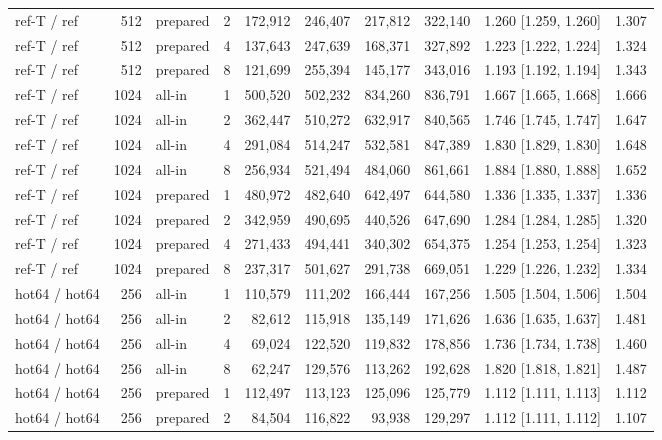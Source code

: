 \begin{table}[t]
{\begin{tabular}{lrlrrrrrlr}
ref-T / ref & 512 & prepared & 2 & 172{,}912 & 246{,}407 & 217{,}812 & 322{,}140 & 1.260 [1.259, 1.260] & 1.307 \\
ref-T / ref & 512 & prepared & 4 & 137{,}643 & 247{,}639 & 168{,}371 & 327{,}892 & 1.223 [1.222, 1.224] & 1.324 \\
ref-T / ref & 512 & prepared & 8 & 121{,}699 & 255{,}394 & 145{,}177 & 343{,}016 & 1.193 [1.192, 1.194] & 1.343 \\
ref-T / ref & 1024 & all-in & 1 & 500{,}520 & 502{,}232 & 834{,}260 & 836{,}791 & 1.667 [1.665, 1.668] & 1.666 \\
ref-T / ref & 1024 & all-in & 2 & 362{,}447 & 510{,}272 & 632{,}917 & 840{,}565 & 1.746 [1.745, 1.747] & 1.647 \\
ref-T / ref & 1024 & all-in & 4 & 291{,}084 & 514{,}247 & 532{,}581 & 847{,}389 & 1.830 [1.829, 1.830] & 1.648 \\
ref-T / ref & 1024 & all-in & 8 & 256{,}934 & 521{,}494 & 484{,}060 & 861{,}661 & 1.884 [1.880, 1.888] & 1.652 \\
ref-T / ref & 1024 & prepared & 1 & 480{,}972 & 482{,}640 & 642{,}497 & 644{,}580 & 1.336 [1.335, 1.337] & 1.336 \\
ref-T / ref & 1024 & prepared & 2 & 342{,}959 & 490{,}695 & 440{,}526 & 647{,}690 & 1.284 [1.284, 1.285] & 1.320 \\
ref-T / ref & 1024 & prepared & 4 & 271{,}433 & 494{,}441 & 340{,}302 & 654{,}375 & 1.254 [1.253, 1.254] & 1.323 \\
ref-T / ref & 1024 & prepared & 8 & 237{,}317 & 501{,}627 & 291{,}738 & 669{,}051 & 1.229 [1.226, 1.232] & 1.334 \\
hot64 / hot64 & 256 & all-in & 1 & 110{,}579 & 111{,}202 & 166{,}444 & 167{,}256 & 1.505 [1.504, 1.506] & 1.504 \\
hot64 / hot64 & 256 & all-in & 2 & 82{,}612 & 115{,}918 & 135{,}149 & 171{,}626 & 1.636 [1.635, 1.637] & 1.481 \\
hot64 / hot64 & 256 & all-in & 4 & 69{,}024 & 122{,}520 & 119{,}832 & 178{,}856 & 1.736 [1.734, 1.738] & 1.460 \\
hot64 / hot64 & 256 & all-in & 8 & 62{,}247 & 129{,}576 & 113{,}262 & 192{,}628 & 1.820 [1.818, 1.821] & 1.487 \\
hot64 / hot64 & 256 & prepared & 1 & 112{,}497 & 113{,}123 & 125{,}096 & 125{,}779 & 1.112 [1.111, 1.113] & 1.112 \\
hot64 / hot64 & 256 & prepared & 2 & 84{,}504 & 116{,}822 & 93{,}938 & 129{,}297 & 1.112 [1.111, 1.112] & 1.107 \\

\end{tabular}}
\end{table}

